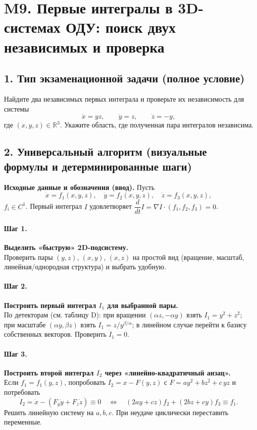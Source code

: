\section{M9. Первые интегралы в 3D-системах ОДУ: поиск двух независимых и проверка}

\subsection*{1. Тип экзаменационной задачи (полное условие)}
Найдите два независимых первых интеграла и проверьте их независимость для системы
\[
\dot x = y z,\qquad
\dot y = z,\qquad
\dot z = -y,
\]
где $(x,y,z)\in\mathbb R^3$. Укажите область, где полученная пара интегралов независима.

\subsection*{2. Универсальный алгоритм (визуальные формулы и детерминированные шаги)}

\textbf{Исходные данные и обозначения (ввод).}
Пусть
\[
\dot x=f_1(x,y,z),\quad \dot y=f_2(x,y,z),\quad \dot z=f_3(x,y,z),
\]
$f_i\in C^1$. Первый интеграл $I$ удовлетворяет $\dfrac{d}{dt}I=\nabla I\cdot (f_1,f_2,f_3)=0$.

\paragraph{Шаг 1.} \textbf{Выделить «быструю» 2D-подсистему.}\\
Проверить пары $(y,z)$, $(x,y)$, $(x,z)$ на простой вид (вращение, масштаб, линейная/однородная структура) и выбрать удобную.

\paragraph{Шаг 2.} \textbf{Построить первый интеграл $I_1$ для выбранной пары.}\\
По детекторам (см. таблицу D): при вращении $(\alpha z,-\alpha y)$ взять $I_1=y^2+z^2$; при масштабе $(\alpha y,\beta z)$ взять $I_1=z/y^{\beta/\alpha}$; в линейном случае перейти к базису собственных векторов. Проверить $\dot I_1=0$.

\paragraph{Шаг 3.} \textbf{Построить второй интеграл $I_2$ через «линейно-квадратичный анзац».}\\
Если $f_1=f_1(y,z)$, попробовать $I_2=x-F(y,z)$ с $F=a y^2+b z^2+c\,yz$ и потребовать
\[
\dot I_2=\dot x-(F_y\dot y+F_z\dot z)\equiv 0
\quad\Longleftrightarrow\quad
(2a y+c z)f_2+(2b z+c y)f_3\equiv f_1.
\]
Решить линейную систему на $a,b,c$. При неудаче циклически переставить переменные.

